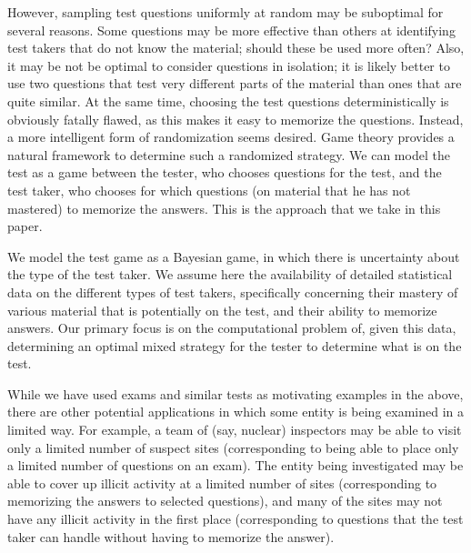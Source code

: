 \documentclass{article}
\begin{document}
However, sampling test questions uniformly at random may be suboptimal
for several reasons.  Some questions may be more effective than others
at identifying test takers that do not know the material; should these
be used more often?  Also, it may be not be optimal to consider
questions in isolation; it is likely better to use two questions that
test very different parts of the material than ones that are quite
similar.  At the same time, choosing the test questions
deterministically is obviously fatally flawed, as this makes it easy
to memorize the questions.  Instead, a more intelligent form of
randomization seems desired.  Game theory provides a natural framework
to determine such a randomized strategy.  We can model the test as a
game between the tester, who chooses questions for the test, and the
test taker, who chooses for which questions (on material that he has
not mastered) to memorize the answers.  This is the approach that we
take in this paper.

We model the test game as a Bayesian game, in which there is
uncertainty about the type of the test taker.
We assume here the availability of detailed statistical data on the
different types of test takers, specifically concerning their mastery
of various material that is potentially on the test, and their ability
to memorize answers.  Our primary focus is on the computational
problem of, given this data, determining an optimal mixed strategy for
the tester to determine what is on the test.

While we have used exams and similar tests as motivating examples in
the above, there are other potential applications in which some entity
is being examined in a limited way.  For example, a team of (say,
nuclear) inspectors may be able to visit only a limited number of
suspect sites (corresponding to being able to place only a limited
number of questions on an exam).  The entity being investigated may be
able to cover up illicit activity at a limited number of sites
(corresponding to memorizing the answers to selected questions), and
many of the sites may not have any illicit activity in the first place
(corresponding to questions that the test taker can handle without
having to memorize the answer).
\end{document}

